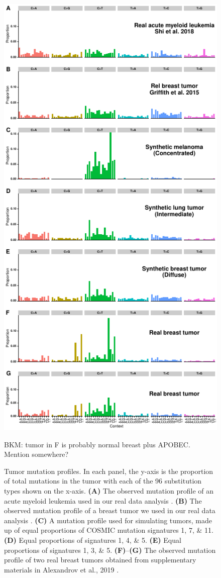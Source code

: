 \documentclass[a4,center,fleqn]{NAR}
\newcommand{\bkmcomment}[1]{{\color{blue}BKM: #1}}
\begin{document}
\begin{figure}
  \begin{center}
  \includegraphics{figures/signatures_only.pdf}
  \end{center}
  \bkmcomment{tumor in F is probably normal breast plus APOBEC. Mention somewhere?}
  \caption{Tumor mutation profiles.
  In each panel, the y-axis is the proportion of total mutations in the tumor with each of the 96 substitution types shown on the x-axis.
  \textbf{(A)} The observed mutation profile of an acute myeloid leukemia used in our real data analysis \cite{Griffith2015}.
  \textbf{(B)} The observed mutation profile of a breast tumor we used in our real data analysis \cite{Shi2018}.
  \textbf{(C)} A mutation profile used for simulating tumors, made up of equal proportions of COSMIC mutation signatures 1, 7, \& 11.
  \textbf{(D)} Equal proportions of signatures 1, 4, \& 5.
  \textbf{(E)} Equal proportions of signatures 1, 3, \& 5.
  \textbf{(F)}--\textbf{(G)} The observed mutation profile of two real breast tumors obtained from supplementary materials in Alexandrov et al., 2019 \citep{Alexandrov2019}.
  }
  \label{NAR-sigfig}
 \end{figure}
\end{document}
